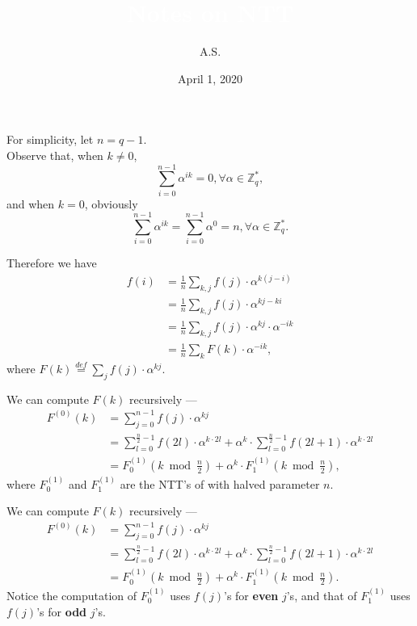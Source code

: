 \documentclass{beamer}	%
\title{\textcolor{white}{Notes on NTT}}
\subtitle{\textcolor{white}{}}
\author{A.S.}
\date{April 1, 2020}
\newcommand{\Z}{\mathbb{Z}}
\theoremstyle{plain}
\theoremstyle{definition}
\theoremstyle{remark}
\numberwithin{equation}{section}
\begin{document}
\begin{frame}
For simplicity, let $n = q - 1$.\\
Observe that, when $k \ne 0$, 
\[
\sum_{i=0}^{n-1}\alpha^{ik} = 0, \forall \alpha \in \Z_q^*,
\]
and when $k = 0$, obviously
\[
\sum_{i=0}^{n-1}\alpha^{ik} = \sum_{i=0}^{n-1}\alpha^0 = n, \forall \alpha \in \Z_q^*.
\]
\end{frame}

\begin{frame}
Therefore we have
\begin{align*}
f(i) & = \frac{1}{n}\sum_{k,j}{f(j) \cdot \alpha^{k(j-i)}} \\
     & = \frac{1}{n}\sum_{k,j}{f(j) \cdot \alpha^{kj-ki}} \\
     & = \frac{1}{n}\sum_{k,j}{f(j) \cdot \alpha^{kj} \cdot \alpha^{-ik}} \\
     & = \frac{1}{n}\sum_k{F(k) \cdot \alpha^{-ik}},
\end{align*}
where $F(k) \overset{def}{=} \sum_{j}{f(j) \cdot \alpha^{kj}}$.
\end{frame}

\begin{frame}
We can compute $F(k)$ recursively ---
\begin{align*}
F^{(0)}(k) &= \sum_{j=0}^{n-1}{f(j) \cdot \alpha^{kj}} \\
           &= \sum_{l=0}^{\frac{n}{2}-1}{f(2l) \cdot \alpha^{k \cdot 2l}} + \alpha^{k} \cdot \sum_{l=0}^{\frac{n}{2}-1}{f(2l+1) \cdot \alpha^{k \cdot 2l}} \\
           &= F^{(1)}_0(k \bmod \frac{n}{2}) + \alpha^{k} \cdot F^{(1)}_1(k \bmod \frac{n}{2}),
\end{align*}
where $F^{(1)}_0$ and $F^{(1)}_1$ are the NTT's of with halved parameter $n$.

\end{frame}

\begin{frame}
We can compute $F(k)$ recursively ---
\begin{align*}
F^{(0)}(k) &= \sum_{j=0}^{n-1}{f(j) \cdot \alpha^{kj}} \\
&= \sum_{l=0}^{\frac{n}{2}-1}{f(2l) \cdot \alpha^{k \cdot 2l}} + \alpha^{k} \cdot \sum_{l=0}^{\frac{n}{2}-1}{f(2l+1) \cdot \alpha^{k \cdot 2l}} \\
&= F^{(1)}_0(k \bmod \frac{n}{2}) + \alpha^{k} \cdot F^{(1)}_1(k \bmod \frac{n}{2}).
\end{align*}
Notice the computation of $F^{(1)}_0$ uses $f(j)$'s for \textbf{even} $j$'s, and that of $F^{(1)}_1$ uses $f(j)$'s for \textbf{odd} $j$'s.

\end{frame}
\end{document}
